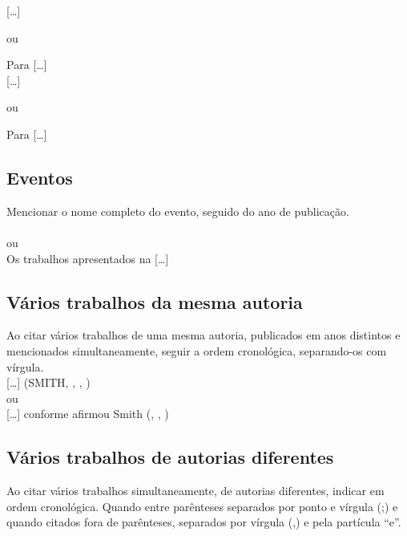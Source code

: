 [\ldots] \cite{Bagnato2018}

ou 

Para  [\ldots] \\


[\ldots] \cite{Rocha2017}

ou 

Para  [\ldots] \\


\subsection{Eventos}

Mencionar o nome completo do evento, seguido do ano de publicação.\\

\cite{reuniao1985}\\

ou\\

Os trabalhos apresentados na  [\ldots]\\

\subsection{V\'arios trabalhos da mesma autoria}

Ao citar v\'arios trabalhos de uma mesma autoria, publicados em anos distintos e mencionados simultaneamente, seguir a ordem cronológica, separando-os com vírgula.\\

[\ldots] (SMITH, \citeyear{Smith1990}, \citeyear{Smith1999}, \citeyear{Smith2002}) \\

ou\\

[\ldots] conforme afirmou Smith (\citeyear{Smith1990}, \citeyear{Smith1999}, \citeyear{Smith2002})\\


\subsection{V\'arios trabalhos de autorias diferentes}

Ao citar v\'arios trabalhos simultaneamente, de autorias diferentes, indicar
em ordem cronológica. Quando entre par\^enteses separados por ponto e
vírgula (;) e quando citados fora de par\^enteses, separados por vírgula (,) e pela
partícula “e”.\\

